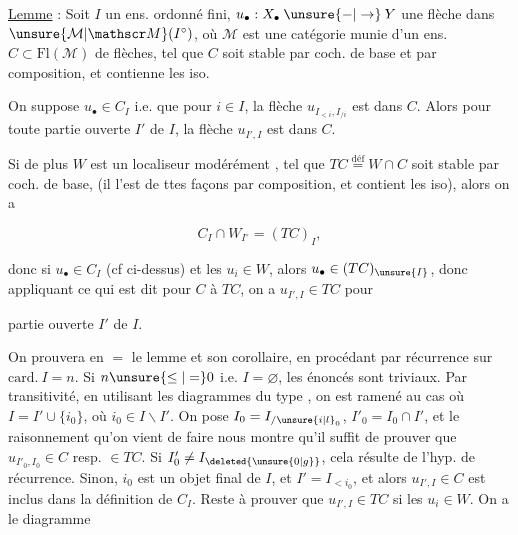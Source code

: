 \uline{Lemme} : Soit $I$ un ens. ordonné fini,  $u_\bullet:X_\bullet\mathbin{\unsure{-|\to}}Y$ une flèche dans $\unsure{\mathcal M|\mathscr M}(I^\circ)$, où $\mathcal M$ est une catégorie munie d’un ens. $C\subset\mathrm{Fl}(\mathcal M)$ de flèches, tel que $C$ soit stable par coch. de base et par \inserted{\unsure{(*)}} composition, et contienne les iso.

On suppose $u_\bullet\in C_I$ i.e. que pour $i\in I$, la flèche $u_{I_{<i},I_{/i}}$ est dans $C$. Alors pour toute partie ouverte $I'$ de $I$, la flèche $u_{I',I}$ est dans $C$.


 Si de plus $W$  est un localiseur modérément , tel que  $TC\overset{\text{déf}}{=}W\cap C$ soit stable par coch. de base,  (il l’est de ttes façons par composition, et contient les iso), alors on a

\[
 C_I\cap W_{I^\circ}=(TC)_I,
\]

donc si $u_\bullet\in C_I$ (cf ci-dessus) et les $u_i\in W$, alors $u_\bullet\in(TC)_{\unsure{I}}$, donc  appliquant ce qui est dit pour $C$ à $TC$, on a $u_{I',I}\in TC$ pour 


partie ouverte $I'$ de $I$. 

On prouvera en $=$  le lemme et son corollaire, en procédant par récurrence sur $\mathrm{card}.\ I=n$. Si $n\unsure{\leq|=}0$ i.e. $I=\varnothing$, les énoncés sont triviaux. Par transitivité, en utilisant les diagrammes du type , on est ramené au cas où $I=I'\cup\{i_0\}$, où $i_0\in I\smallsetminus I'$. On pose  $I_0=I_{/\unsure{i|l}_0}$, $I'_0=I_0\cap I'$, et le raisonnement qu’on vient de faire nous montre qu’il suffit de prouver que $u_{I'_0,I_0}\in C$ resp. $\in TC$. Si $I'_0\ne I_{\deleted{\unsure{0|g}}}$, cela résulte de l’hyp. de récurrence. Sinon, $i_0$ est un objet final de $I$, et $I'=I_{<i_0}$, et alors $u_{I',I}\in C$  est inclus dans la définition de $C_I$.  Reste à prouver  que $u_{I',I}\in TC$ si les $u_i\in W$. On a le diagramme

